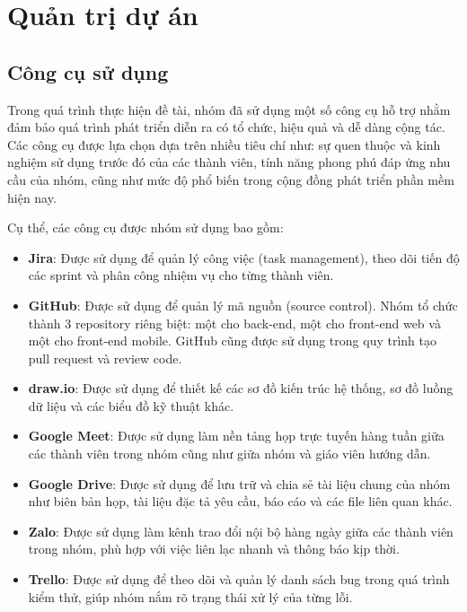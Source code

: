 \chapter{Quản trị dự án}
\label{Chapter4}

\section{Công cụ sử dụng}
Trong quá trình thực hiện đề tài, nhóm đã sử dụng một số công cụ hỗ trợ nhằm đảm bảo quá trình phát triển diễn ra có tổ chức, hiệu quả và dễ dàng cộng tác. Các công cụ được lựa chọn dựa trên nhiều tiêu chí như: sự quen thuộc và kinh nghiệm sử dụng trước đó của các thành viên, tính năng phong phú đáp ứng nhu cầu của nhóm, cũng như mức độ phổ biến trong cộng đồng phát triển phần mềm hiện nay.
 
Cụ thể, các công cụ được nhóm sử dụng bao gồm:
 
\begin{itemize}
    \item \textbf{Jira}: Được sử dụng để quản lý công việc (task management), theo dõi tiến độ các sprint và phân công nhiệm vụ cho từng thành viên.
 
    \item \textbf{GitHub}: Được sử dụng để quản lý mã nguồn (source control). Nhóm tổ chức thành 3 repository riêng biệt: một cho back-end, một cho front-end web và một cho front-end mobile. GitHub cũng được sử dụng trong quy trình tạo pull request và review code.
 
    \item \textbf{draw.io}: Được sử dụng để thiết kế các sơ đồ kiến trúc hệ thống, sơ đồ luồng dữ liệu và các biểu đồ kỹ thuật khác.
 
    \item \textbf{Google Meet}: Được sử dụng làm nền tảng họp trực tuyến hàng tuần giữa các thành viên trong nhóm cũng như giữa nhóm và giáo viên hướng dẫn.
 
    \item \textbf{Google Drive}: Được sử dụng để lưu trữ và chia sẻ tài liệu chung của nhóm như biên bản họp, tài liệu đặc tả yêu cầu, báo cáo và các file liên quan khác.
 
    \item \textbf{Zalo}: Được sử dụng làm kênh trao đổi nội bộ hàng ngày giữa các thành viên trong nhóm, phù hợp với việc liên lạc nhanh và thông báo kịp thời.
 
    \item \textbf{Trello}: Được sử dụng để theo dõi và quản lý danh sách bug trong quá trình kiểm thử, giúp nhóm nắm rõ trạng thái xử lý của từng lỗi.
\end{itemize}

